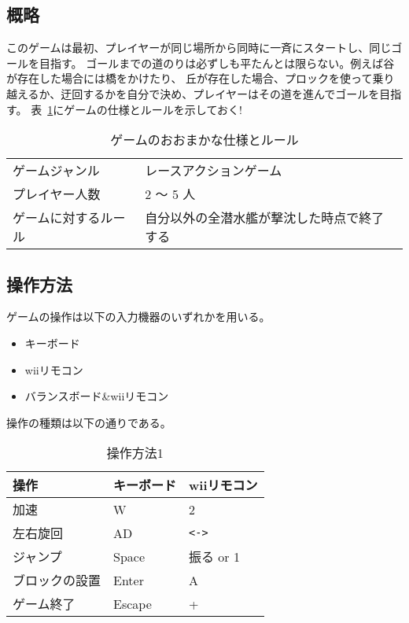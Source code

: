 \documentclass{jarticle}
\begin{document}
\clearpage
\subsection{概略}
このゲームは最初、プレイヤーが同じ場所から同時に一斉にスタートし、同じゴールを目指す。
ゴールまでの道のりは必ずしも平たんとは限らない。例えば谷が存在した場合には橋をかけたり、
丘が存在した場合、プロックを使って乗り越えるか、迂回するかを自分で決め、プレイヤーはその道を進んでゴールを目指す。
表~\ref{table:rule}にゲームの仕様とルールを示しておく!
\begin{table}[H]
    \caption{ゲームのおおまかな仕様とルール}
    \label{table:rule}
    \begin{center}
    \begin{tabular}{|l|l|}\hline
    ゲームジャンル & レースアクションゲーム\\
    プレイヤー人数 & 2 ～ 5 人              \\
    ゲームに対するルール & 自分以外の全潜水艦が撃沈した時点で終了する \\ \hline
    \end{tabular}
    \end{center}
\end{table}

\subsection{操作方法}
ゲームの操作は以下の入力機器のいずれかを用いる。
\begin{itemize}
    \item キーボード
    \item wiiリモコン
    \item バランスボード\&wiiリモコン
\end{itemize}

操作の種類は以下の通りである。
\begin{table}[H]
    \caption{操作方法1}
    \label{table:control1}
    \begin{center}
    \begin{tabular}{|l|l|l|}\hline
    操作 & キーボード & wiiリモコン\\ \hline
    加速 & W & 2 \\ \hline
    左右旋回 & AD & \verb+<->+ \\ \hline
    ジャンプ & Space & 振る or 1 \\ \hline
    ブロックの設置 & Enter & A \\ \hline
    ゲーム終了 & Escape& + \\\hline
    
    \end{tabular}
    \end{center}
\end{table}
\end{document}
